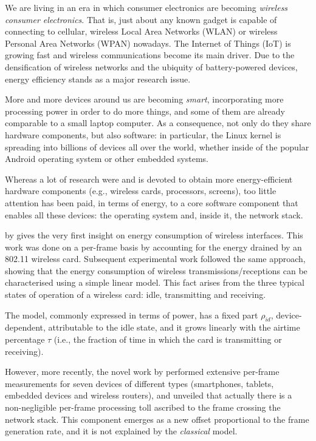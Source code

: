\documentclass[twoside,nohyper]{tufte-book}
\theoremstyle{definition}
\theoremstyle{definition}
\theoremstyle{definition}
\theoremstyle{remark}
\begin{document}
We are living in an era in which consumer electronics are becoming
\emph{wireless consumer electronics}. That is, just about any known
gadget is capable of connecting to cellular, wireless Local Area
Networks (WLAN) or wireless Personal Area Networks (WPAN) nowadays. The
Internet of Things (IoT) is growing fast and wireless communications
become its main driver. Due to the densification of wireless networks
and the ubiquity of battery-powered devices, energy efficiency stands as
a major research issue.

More and more devices around us are becoming \emph{smart}, incorporating
more processing power in order to do more things, and some of them are
already comparable to a small laptop computer. As a consequence, not
only do they share hardware components, but also software: in
particular, the Linux kernel is spreading into billions of devices all
over the world, whether inside of the popular Android operating system
or other embedded systems.

Whereas a lot of research were and is devoted to obtain more
energy-efficient hardware components (e.g., wireless cards, processors,
screens), too little attention has been paid, in terms of energy, to a
core software component that enables all these devices: the operating
system and, inside it, the network stack.

 by \citet{Feeney2001}\cite{Feeney2001}
gives the very first insight on energy consumption of wireless
interfaces. This work was done on a per-frame basis by accounting for
the energy drained by an 802.11 wireless card. Subsequent experimental
work followed the same approach, showing that the energy consumption of
wireless transmissions/receptions can be characterised using a simple
linear model. This fact arises from the three typical states of
operation of a wireless card: idle, transmitting and receiving.

The model, commonly expressed in terms of power, has a fixed part
\(\rho_{id}\), device-dependent, attributable to the idle state, and it
grows linearly with the airtime percentage \(\tau\) (i.e., the fraction
of time in which the card is transmitting or receiving).

However, more recently, the novel work by
\citet{Serrano2014}\cite{Serrano2014} performed extensive per-frame
measurements for seven devices of different types (smartphones, tablets,
embedded devices and wireless routers), and unveiled that actually there
is a non-negligible per-frame processing toll ascribed to the frame
crossing the network stack. This component emerges as a new offset
proportional to the frame generation rate, and it is not explained by
the \emph{classical} model.
\end{document}
